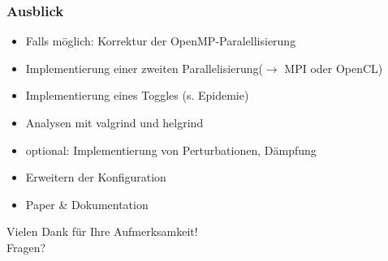 \documentclass[xcolor=dvipsnames]{beamer}
\begin{document}
\begin{frame}\frametitle{Ausblick}
	\begin{itemize}
		\item Falls möglich: Korrektur der OpenMP-Paralellisierung
		\item Implementierung einer zweiten Parallelisierung\newline($\rightarrow$ MPI oder OpenCL)
		\item Implementierung eines Toggles (s. Epidemie)
		\item Analysen mit valgrind und helgrind
		\item optional: Implementierung von Perturbationen, Dämpfung
		\item Erweitern der Konfiguration
		\item Paper \& Dokumentation
	\end{itemize}
\end{frame}

\begin{frame}
	\centering
	\textcolor{htwgreen}{{\LARGE Vielen Dank für Ihre Aufmerksamkeit!\\[6ex] Fragen?}}
\end{frame}
\end{document}
